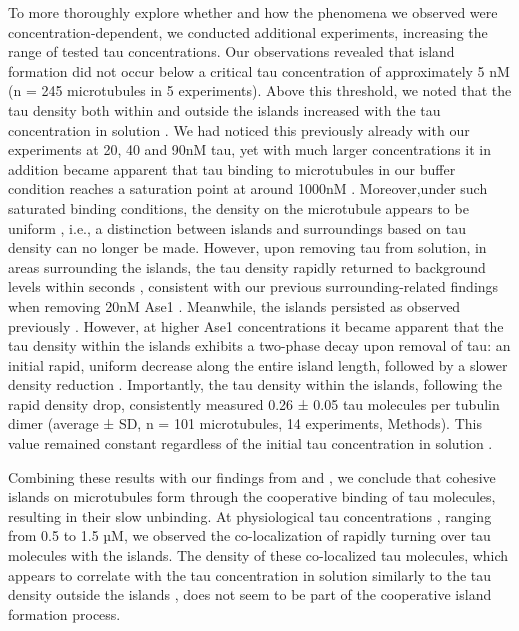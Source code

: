 To more thoroughly explore whether and how the phenomena we observed were concentration-dependent, we conducted additional experiments, increasing the range of tested tau concentrations. Our observations revealed that island formation did not occur below a critical tau concentration of approximately 5 nM (n = 245 microtubules in 5 experiments). Above this threshold, we noted that the tau density both within and outside the islands increased with the tau concentration in solution . We had noticed this previously already with our experiments at 20, 40 and 90nM tau, yet with much larger concentrations it in addition became apparent that tau binding to microtubules in our buffer condition reaches a saturation point at around 1000nM . Moreover,under such saturated binding conditions, the density on the microtubule appears to be uniform , i.e., a distinction between islands and surroundings based on tau density can no longer be made. However, upon removing tau from solution, in areas surrounding the islands, the tau density rapidly returned to background levels within seconds , consistent with our previous surrounding-related findings when removing 20nM Ase1 . Meanwhile, the islands persisted  as observed previously . However, at higher Ase1 concentrations it became apparent that the tau density within the islands exhibits a two-phase decay upon removal of tau: an initial rapid, uniform decrease along the entire island length, followed by a slower density reduction . Importantly, the tau density within the islands, following the rapid density drop, consistently measured 0.26 ± 0.05 tau molecules per tubulin dimer (average ± SD, n = 101 microtubules, 14 experiments, Methods). This value remained constant regardless of the initial tau concentration in solution . \par

Combining these results with our findings from  and , we conclude that cohesive islands on microtubules form through the cooperative binding of tau molecules, resulting in their slow unbinding. At physiological tau concentrations \parencite{Wegmann}, ranging from 0.5 to 1.5 µM, we observed the co-localization of rapidly turning over tau molecules with the islands. The density of these co-localized tau molecules, which appears to correlate with the tau concentration in solution similarly to the tau density outside the islands , does not seem to be part of the cooperative island formation process. \par

